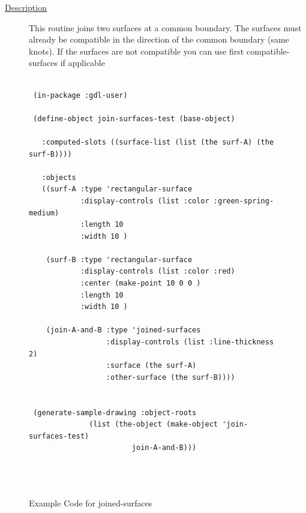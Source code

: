 \documentclass [11pt]{book}
\begin{document}
\begin{itemize}
\begin{description}
\item [
\underline{Description}]


This  routine joins two surfaces at a common boundary. The surfaces must already be compatible in the direction of the common boundary (same knots). If the surfaces are not compatible you can use first compatible-surfaces if applicable



\end{description}




\begin{figure}
\begin{lrbox}{\boxedverb}
\begin{minipage}{\linewidth}
{\small

\begin{verbatim}

 (in-package :gdl-user)

 (define-object join-surfaces-test (base-object) 

   :computed-slots ((surface-list (list (the surf-A) (the surf-B))))
  
   :objects
   ((surf-A :type 'rectangular-surface
            :display-controls (list :color :green-spring-medium)
            :length 10
            :width 10 )
                                        
    (surf-B :type 'rectangular-surface
            :display-controls (list :color :red)
            :center (make-point 10 0 0 )
            :length 10
            :width 10 )
   
    (join-A-and-B :type 'joined-surfaces
                  :display-controls (list :line-thickness 2)
                  :surface (the surf-A)
                  :other-surface (the surf-B))))


 (generate-sample-drawing :object-roots 
			  (list (the-object (make-object 'join-surfaces-test) 
					    join-A-and-B)))
 

 
\end{verbatim}}
\end{minipage}
\end{lrbox}
\fbox{\usebox{\boxedverb}}

\caption{Example Code for joined-surfaces}

\label{fig:example-code-joined-surfaces}

\end{figure}


\end{itemize}
\end{document}
